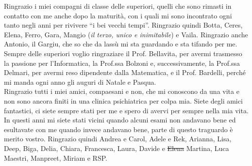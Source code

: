 \noindent Ringrazio i miei compagni di classe delle superiori, quelli che sono rimasti in contatto con me anche dopo la maturità, con i quali mi sono incontrato ogni tanto negli anni per rivivere ``i bei vecchi tempi''. Ringrazio quindi Botta, Ceres, Elena, Ferro, Gara, Mangio (\textit{il terzo, unico e inimitabile}) e Vaila. Ringrazio anche Antonio, il Gargiu, che so che da lassù mi sta guardando e sta tifando per me. Sempre delle superiori voglio ringraziare il Prof. Bellavita, per avermi trasmesso la passione per l'Informatica, la Prof.ssa Bolzoni e, successivamente, la Prof.ssa Delmari, per avermi reso dipendente dalla Matematica, e il Prof. Bardelli, perché mi manda ogni anno gli auguri di Natale e Pasqua. \\
    
\noindent Ringrazio tutti i miei amici, compaesani e non, che mi conoscono da una vita e non sono ancora finiti in una clinica psichiatrica per colpa mia. Siete degli amici fantastici, ci siete sempre stati per me e spero di avervi per sempre nella mia vita. In questi anni mi siete stati vicini quando alcuni esami non andavano bene ed esultavate con me quando invece andavano bene, parte di questo traguardo è merito vostro. Ringrazio quindi Andrea e Carol, Adele e Rek, Arianna, Lisa, Deep, Biga, Delia, Chiara, Francesca, Laura, Davide e \st{Elena} Martina, Luca Maestri, Manpreet, Miriam e RSP. \\

